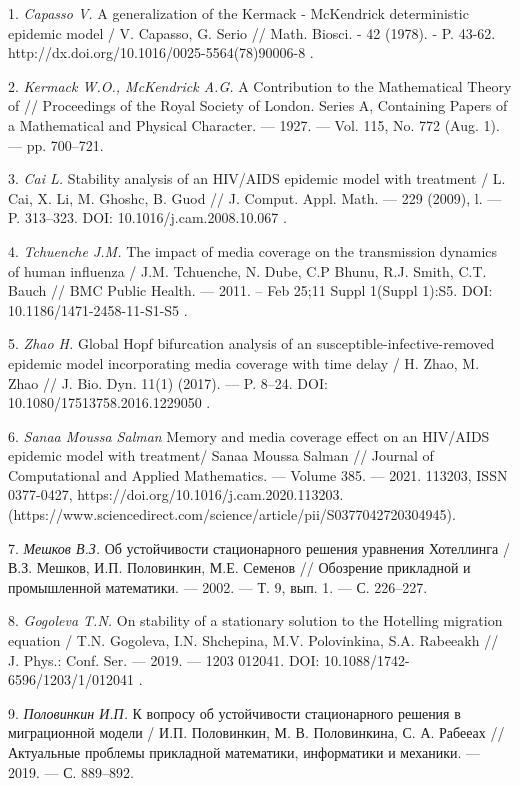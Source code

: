 \litlist

1. {\it  Capasso V.} A generalization of the Kermack - McKendrick
deterministic epidemic model / V. Capasso, G. Serio // Math.
Biosci. - 42 (1978). - P. 43-62.
http://dx.doi.org/10.1016/0025-5564(78)90006-8 .

2. {\it  Kermack W.O.,  McKendrick A.G.} A Contribution to the
Mathematical Theory of  // Proceedings of the Royal Society of
London. Series A, Containing Papers of a Mathematical and Physical
Character. --- 1927. --- Vol. 115, No. 772 (Aug. 1). --- pp.
700--721.

3. {\it   Cai L.} Stability analysis of an HIV/AIDS epidemic model
with treatment / L. Cai, X. Li, M. Ghoshc, B. Guod // J. Comput.
Appl. Math. --- 229 (2009), l. --- P. 313--323. DOI:
10.1016/j.cam.2008.10.067 .

4.  {\it Tchuenche J.M.} The impact of media coverage on the
transmission dynamics of human influenza / J.M. Tchuenche, N.
Dube, C.P Bhunu, R.J. Smith, C.T. Bauch // BMC Public Health. ---
2011. -- Feb 25;11 Suppl 1(Suppl 1):S5. DOI:
10.1186/1471-2458-11-S1-S5 .

5. {\it Zhao H.} Global Hopf bifurcation analysis of an
susceptible-infective-removed epidemic model incorporating media
coverage with time delay / H. Zhao, M. Zhao // J. Bio. Dyn. 11(1)
(2017). --- P. 8--24. DOI: 10.1080/17513758.2016.1229050 .

6. {\it Sanaa Moussa Salman} Memory and media coverage effect on
an HIV/AIDS epidemic model with treatment/ Sanaa Moussa Salman //
Journal of Computational and Applied Mathematics. --- Volume 385.
--- 2021. 113203, ISSN 0377-0427,
https://doi.org/10.1016/j.cam.2020.113203.
(https://www.sciencedirect.com/science/article/pii/S0377042720304945).

7. {\it  Мешков В.З.} Об устойчивости стационарного решения
уравнения Хотеллинга / В.З.  Мешков, И.П. Половинкин, М.Е. Семенов
// Обозрение прикладной и промышленной математики. --- 2002. --- Т. 9,
вып. 1. --- С. 226--227.

8. {\it  Gogoleva T.N.} On stability of a stationary solution to
the Hotelling migration equation / T.N. Gogoleva, I.N. Shchepina,
M.V. Polovinkina, S.A. Rabeeakh // J. Phys.: Conf. Ser. --- 2019.
--- 1203 012041. DOI: 10.1088/1742-6596/1203/1/012041 .

9. {\it Половинкин И.П.} К вопросу об устойчивости стационарного
решения в миграционной модели / И.П. Половинкин, М. В.
Половинкина, С. А. Рабееах // Актуальные проблемы прикладной
математики, информатики и механики. --- 2019. --- С. 889--892.

